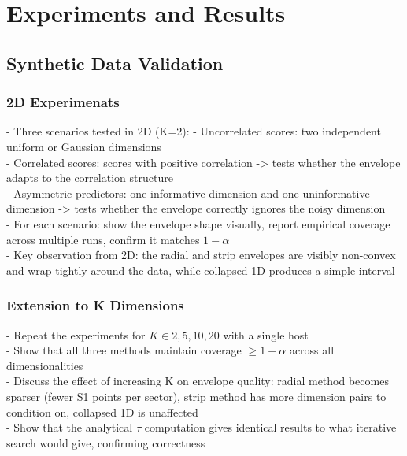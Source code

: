 \section{Experiments and Results}
\label{sec5: experiments}
\subsection{Synthetic Data Validation}


\subsubsection{2D Experimenats}
\noindent - Three scenarios tested in 2D (K=2):
     - Uncorrelated scores: two independent uniform or    Gaussian dimensions\\
     - Correlated scores: scores with positive correlation -> tests whether the envelope adapts to the correlation structure\\
     - Asymmetric predictors: one informative dimension and one uninformative dimension -> tests whether the envelope correctly ignores the noisy dimension\\
- For each scenario: show the envelope shape visually, report empirical coverage across multiple runs, confirm it matches $1-\alpha$\\
- Key observation from 2D: the radial and strip envelopes are visibly non-convex and wrap tightly around the data, while collapsed 1D produces a simple interval


\subsubsection{Extension to K Dimensions}
\noindent - Repeat the experiments for $K \in {2,5,10,20}$ with a single host\\
- Show that all three methods maintain coverage $\geq 1-\alpha$ across all dimensionalities\\
- Discuss the effect of increasing K on envelope quality: radial method becomes sparser (fewer S1 points per sector), strip method has more dimension pairs to condition on, collapsed 1D is unaffected\\
- Show that the analytical $\tau$ computation gives identical results to what iterative search would give, confirming correctness

